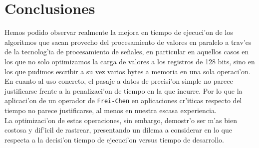 \documentclass[11pt]{article}
\begin{document}
\section{Conclusiones}
Hemos podido observar realmente la mejora en tiempo de ejecuci'on de los algoritmos que sacan provecho del procesamiento de valores en paralelo a trav'es de la tecnolog'ia de procesamiento de se\~{n}ales, en particular en aquellos casos en los que no solo optimizamos la carga de valores a los registros de 128 bits, sino en los que pudimos escribir a su vez varios bytes a memoria en una sola operaci'on.  En cuanto al uso concreto, el pasaje a datos de precisi'on simple no parece justificarse frente a la penalizaci'on de tiempo en la que incurre.  Por lo que la aplicaci'on de un operador de \verb'Frei-Chen' en aplicaciones cr'iticas respecto del tiempo no parece justificarse, al menos en nuestra escasa experiencia.\\
La optimizaci'on de estas operaciones, sin embargo, demostr'o ser m'as bien costosa y dif'icil de rastrear, presentando un dilema a considerar en lo que respecta a la decisi'on tiempo de ejecuci'on versus tiempo de desarrollo.
\end{document}
